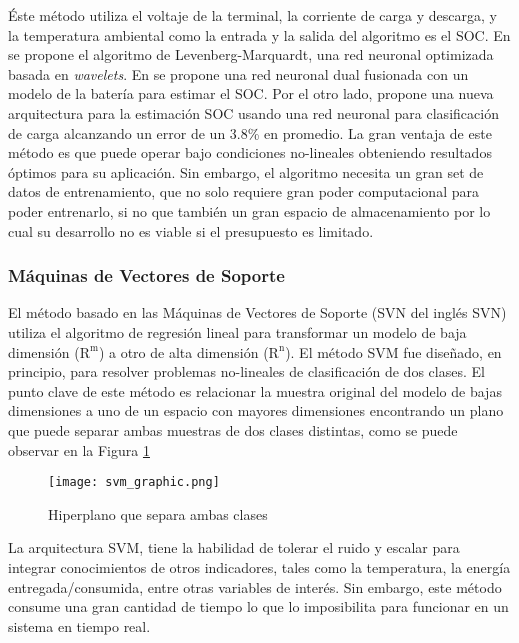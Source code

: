 \noindent \'Este m\'etodo utiliza el voltaje de la terminal, la corriente de
carga y descarga, y la temperatura ambiental como la entrada y la salida del
algoritmo es el \acrshort{SOC}. En \cite{XIA2018694} se propone el algoritmo
de Levenberg-Marquardt, una red neuronal optimizada basada en \emph{wavelets}.
En \cite{DANG2016356} se propone una red neuronal dual fusionada con un modelo 
de la bater\'ia para estimar el \acrshort{SOC}. Por el otro lado, 
\cite{TONG2016236} propone una nueva arquitectura para la estimaci\'on 
\acrshort{SOC} usando una red neuronal para clasificaci\'on de carga alcanzando 
un error de un 3.8\% en promedio. La gran ventaja de este m\'etodo es que puede 
operar bajo condiciones no-lineales obteniendo resultados \'optimos para su 
aplicaci\'on. Sin embargo, el algoritmo necesita un gran set de datos de 
entrenamiento, que no solo requiere gran poder computacional para poder 
entrenarlo, si no que tambi\'en un gran espacio de almacenamiento por lo cual su 
desarrollo no es viable si el presupuesto es limitado.

\newpage

\subsubsection{M\'aquinas de Vectores de Soporte}

\noindent El m\'etodo basado en las M\'aquinas de Vectores de Soporte 
(\acrshort{SVN} del ingl\'es \acrlong{SVN}) utiliza el algoritmo de regresi\'on 
lineal para transformar un modelo de baja dimensi\'on ($\mathrm{R^m}$) a otro de 
alta dimensi\'on ($\mathrm{R^n}$). El m\'etodo \acrshort{SVM} fue diseñado, 
en principio, para resolver problemas no-lineales de clasificaci\'on de dos 
clases. El punto clave de este m\'etodo es relacionar la muestra original del 
modelo de bajas dimensiones a uno de un espacio con mayores dimensiones 
encontrando un plano que puede separar ambas muestras de dos clases distintas, como 
se puede observar en la Figura \ref{svn_graph}

\begin{figure}[h!]
    \begin{center}
        \texttt{[image: svm\_graphic.png]}
        \caption{Hiperplano que separa ambas clases}
        \label{svn_graph}
    \end{center}
\end{figure}

\noindent La arquitectura \acrshort{SVM}, tiene la habilidad de tolerar el ruido 
y escalar para integrar conocimientos de otros indicadores, tales como la 
temperatura, la energ\'ia entregada/consumida, entre otras variables de 
inter\'es. Sin embargo, este m\'etodo consume una gran cantidad de tiempo lo que 
lo imposibilita para funcionar en un sistema en tiempo real.

